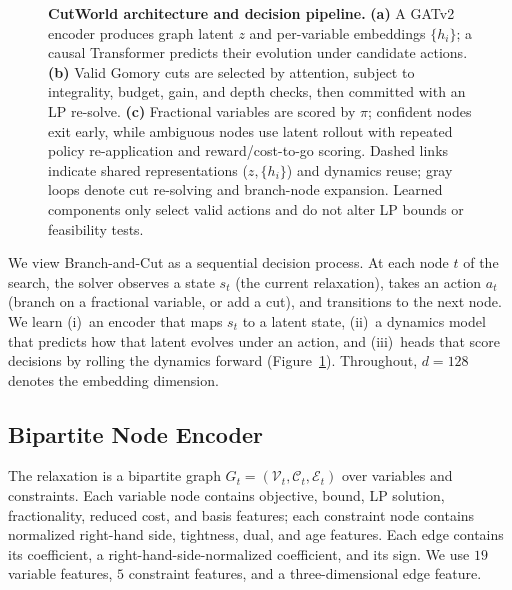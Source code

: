 \documentclass[11pt,a4paper]{article}
\begin{document}
\begin{figure}[t]
{\begin{tikzpicture}
\end{tikzpicture}
}
\caption{\textbf{CutWorld architecture and decision pipeline.}
\textbf{(a)} A GATv2 encoder produces graph latent $z$ and per-variable embeddings $\{h_i\}$; a causal Transformer predicts their evolution under candidate actions.
\textbf{(b)} Valid Gomory cuts are selected by attention, subject to integrality, budget, gain, and depth checks, then committed with an LP re-solve.
\textbf{(c)} Fractional variables are scored by $\pi$; confident nodes exit early, while ambiguous nodes use latent rollout with repeated policy re-application and reward/cost-to-go scoring.
Dashed links indicate shared representations ($z,\{h_i\}$) and dynamics reuse; gray loops denote cut re-solving and branch-node expansion. Learned components only select valid actions and do not alter LP bounds or feasibility tests.}
\label{fig:arch}
\end{figure}

We view Branch-and-Cut as a sequential decision process. At each node $t$ of the search, the solver observes a state $s_t$ (the current relaxation), takes an action $a_t$ (branch on a fractional variable, or add a cut), and transitions to the next node. We learn (i)~an encoder that maps $s_t$ to a latent state, (ii)~a dynamics model that predicts how that latent evolves under an action, and (iii)~heads that score decisions by rolling the dynamics forward (Figure~\ref{fig:arch}). Throughout, $d=128$ denotes the embedding dimension.

\subsection{Bipartite Node Encoder}

The relaxation is a bipartite graph
$G_t=(\mathcal{V}_t,\mathcal{C}_t,\mathcal{E}_t)$ over variables and constraints. Each variable node contains objective, bound, LP solution, fractionality, reduced cost, and basis features; each constraint node contains normalized right-hand side, tightness, dual, and age features. Each edge contains its coefficient, a right-hand-side-normalized coefficient, and its sign. We use $19$ variable features, $5$ constraint features, and a three-dimensional edge feature.
\end{document}

